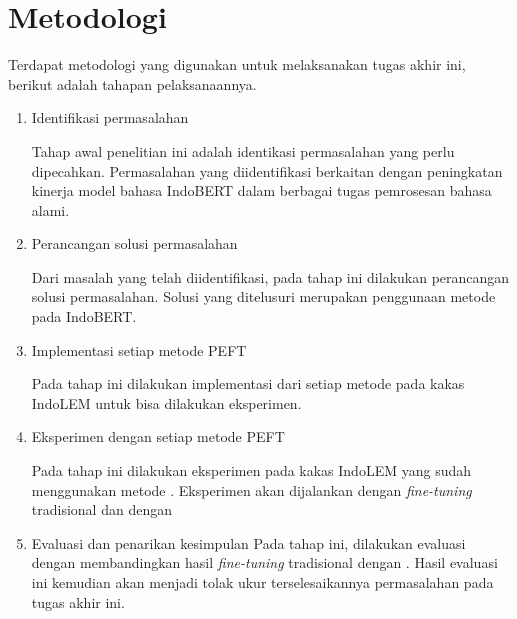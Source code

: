 \section{Metodologi}

Terdapat metodologi yang digunakan untuk melaksanakan tugas akhir ini, berikut adalah tahapan pelaksanaannya.

\begin{enumerate}
    \item Identifikasi permasalahan
    
    Tahap awal penelitian ini adalah identikasi permasalahan yang perlu dipecahkan. Permasalahan yang diidentifikasi berkaitan dengan peningkatan kinerja model bahasa IndoBERT dalam berbagai tugas pemrosesan bahasa alami.

    \item Perancangan solusi permasalahan
    
    Dari masalah yang telah diidentifikasi, pada tahap ini dilakukan perancangan solusi permasalahan. Solusi yang ditelusuri merupakan penggunaan metode \PETL pada IndoBERT.

    \item Implementasi setiap metode PEFT
    
    Pada tahap ini dilakukan implementasi dari setiap metode \PETL pada kakas IndoLEM untuk bisa dilakukan eksperimen.

    \item Eksperimen dengan setiap metode PEFT
    
    Pada tahap ini dilakukan eksperimen pada kakas IndoLEM yang sudah menggunakan metode \PETL. Eksperimen akan dijalankan dengan \textit{fine-tuning} tradisional dan \PETL dengan 

    \item Evaluasi dan penarikan kesimpulan
    Pada tahap ini, dilakukan evaluasi dengan membandingkan hasil \textit{fine-tuning} tradisional dengan \PETL. Hasil evaluasi ini kemudian akan menjadi tolak ukur terselesaikannya permasalahan pada tugas akhir ini.

\end{enumerate}